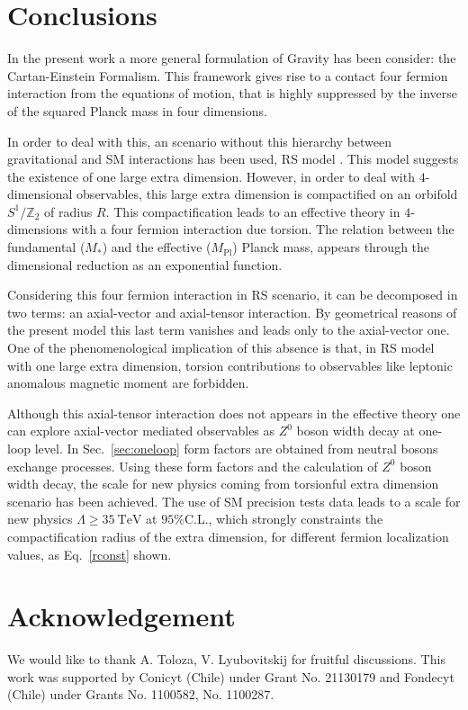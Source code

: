 \documentclass[twocolumn,showpacs,showkeys,prd,superscriptaddress]{revtex4-1}
\begin{document}
\section{\label{sec:conclusions}Conclusions}

In the present work a more general formulation of Gravity has been consider: the Cartan-Einstein Formalism. This framework gives rise to a contact four fermion interaction from the equations of motion, that is highly suppressed by the inverse of the squared Planck mass in four dimensions. 

In order to deal with this, an scenario without this hierarchy between gravitational and SM interactions has been used, RS model \cite{Randall:1999ee}. This model suggests the existence of one large extra dimension. However, in order to deal with $4$-dimensional observables, this large extra dimension is compactified on an orbifold $S^1/\mathbb{Z}_2$ of radius $R$. This compactification leads to an effective theory in $4$-dimensions with a four fermion interaction due torsion. The relation between the fundamental ($M_*$) and the effective ($M_{\text{Pl}}$) Planck mass, appears through the dimensional reduction as an exponential function.  

Considering this four fermion interaction in RS scenario, it can be decomposed in two terms: an axial-vector and axial-tensor interaction. By geometrical reasons of the present model this last term vanishes and leads only to the axial-vector one. One of the phenomenological implication of this absence is that, in RS model with one large extra dimension, torsion contributions to observables like leptonic anomalous magnetic moment are forbidden. 

Although this axial-tensor interaction does not appears in the effective theory one can explore axial-vector mediated observables as $Z^0$ boson width decay at one-loop level. In Sec.~\ref{sec:oneloop} form factors are obtained from neutral bosons exchange processes. Using these form factors and the calculation of $Z^0$ boson width decay, the scale for new physics coming from torsionful extra dimension scenario has been achieved. The use of SM precision tests data leads to a scale for new physics $ \Lambda \geq \SI{35}{\TeV}$ at $95\%$C.L., which strongly constraints the compactification radius of the extra dimension, for different fermion localization values, as Eq.~\eqref{rconst} shown.




\section*{Acknowledgement}

We would like to thank A. Toloza, V. Lyubovitskij for fruitful discussions. This work was supported by Conicyt (Chile) under Grant No. 21130179 and Fondecyt (Chile) under Grants No. 1100582, No. 1100287.






\end{document}

